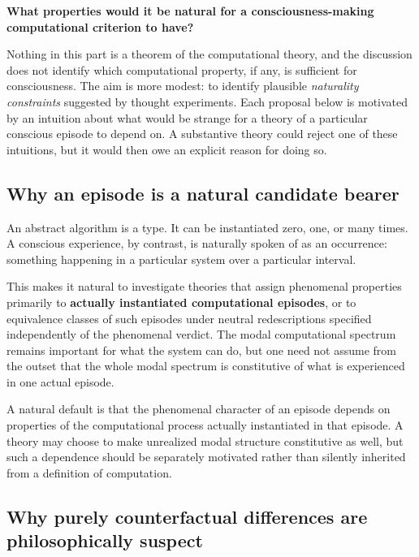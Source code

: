 \documentclass[11pt,a4paper]{article}
\newcounter{thought}
\begin{document}
\begin{center}
\textbf{What properties would it be natural for a consciousness-making computational criterion to have?}
\end{center}

Nothing in this part is a theorem of the computational theory, and the discussion does not identify which computational property, if any, is sufficient for consciousness. The aim is more modest: to identify plausible \emph{naturality constraints} suggested by thought experiments. Each proposal below is motivated by an intuition about what would be strange for a theory of a particular conscious episode to depend on. A substantive theory could reject one of these intuitions, but it would then owe an explicit reason for doing so.

\subsection{Why an episode is a natural candidate bearer}

An abstract algorithm is a type. It can be instantiated zero, one, or many times. A conscious experience, by contrast, is naturally spoken of as an occurrence: something happening in a particular system over a particular interval.

This makes it natural to investigate theories that assign phenomenal properties primarily to \textbf{actually instantiated computational episodes}, or to equivalence classes of such episodes under neutral redescriptions specified independently of the phenomenal verdict. The modal computational spectrum remains important for what the system can do, but one need not assume from the outset that the whole modal spectrum is constitutive of what is experienced in one actual episode.

\begin{principlebox}[title={Phenomenal Actuality: a plausible default}]
A natural default is that the phenomenal character of an episode depends on properties of the computational process actually instantiated in that episode. A theory may choose to make unrealized modal structure constitutive as well, but such a dependence should be separately motivated rather than silently inherited from a definition of computation.
\end{principlebox}

\subsection{Why purely counterfactual differences are philosophically suspect}
\end{document}

